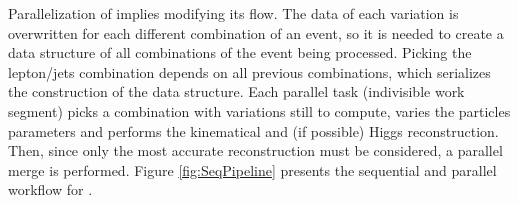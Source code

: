 Parallelization of \ttDilepKinFit implies modifying its flow. The data of each variation is overwritten for each different combination of an event, so it is needed to create a data structure of all combinations of the event being processed. Picking the lepton/jets combination depends on all previous combinations, which serializes the construction of the data structure. Each parallel task (indivisible work segment) picks a combination with variations still to compute, varies the particles parameters and performs the kinematical and (if possible) Higgs reconstruction. Then, since only the most accurate reconstruction must be considered, a parallel merge is performed. Figure \ref{fig:SeqPipeline} presents the sequential and parallel workflow for \ttDilepKinFit.

\begin{figure}[!htp]
	\begin{center}

\end{center}
\end{figure}
